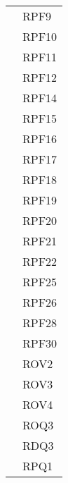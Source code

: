 \begin{longtable}{| p{5cm} | p{5cm} |}
				&	RPF9 \\
				&	RPF10 \\
				&	RPF11 \\
				&	RPF12 \\
				&	RPF14 \\
				&	RPF15 \\
				&	RPF16 \\
				&	RPF17 \\
				&	RPF18 \\
				&	RPF19 \\
				&	RPF20 \\
				&	RPF21 \\
				&	RPF22 \\
				&	RPF25 \\
				& 	RPF26 \\
				& 	RPF28 \\
				& 	RPF30 \\
				
				&	ROV2 \\
				&	ROV3 \\
				&	ROV4 \\
				&	ROQ3 \\
				&	RDQ3 \\
				&	RPQ1 \\
				 \hline
					

\end{longtable}
